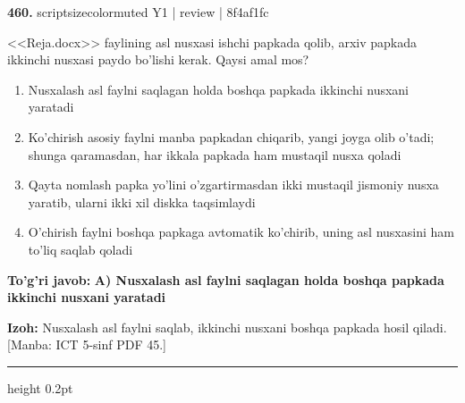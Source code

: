 \documentclass[10pt,a4paper]{article}
\begin{document}
{\bfseries\sffamily\color{ink} 460.} {scriptsizecolor{muted} Y1 | review | 8f4af1fc}
\par
<<Reja.docx>> faylining asl nusxasi ishchi papkada qolib, arxiv papkada ikkinchi nusxasi paydo bo'lishi kerak. Qaysi amal mos?
\begin{enumerate}[label=\Alph*),leftmargin=9mm]
\item Nusxalash asl faylni saqlagan holda boshqa papkada ikkinchi nusxani yaratadi
\item Ko'chirish asosiy faylni manba papkadan chiqarib, yangi joyga olib o'tadi; shunga qaramasdan, har ikkala papkada ham mustaqil nusxa qoladi
\item Qayta nomlash papka yo'lini o'zgartirmasdan ikki mustaqil jismoniy nusxa yaratib, ularni ikki xil diskka taqsimlaydi
\item O'chirish faylni boshqa papkaga avtomatik ko'chirib, uning asl nusxasini ham to'liq saqlab qoladi
\end{enumerate}
\begin{tcolorbox}[enhanced,breakable,colback=teal!4,colframe=teal!60!black,boxrule=0.45pt,arc=1.2mm,left=2.7mm,right=2.7mm,top=1.8mm,bottom=1.8mm,before skip=2mm,after skip=2mm]
{\bfseries\sffamily\color{teal}To'g'ri javob:} \textbf{A) Nusxalash asl faylni saqlagan holda boshqa papkada ikkinchi nusxani yaratadi}
\par\smallskip
{\bfseries Izoh:} Nusxalash asl faylni saqlab, ikkinchi nusxani boshqa papkada hosil qiladi. [Manba: ICT 5-sinf PDF 45.]
\end{tcolorbox}
\vspace{2mm}\hrule height 0.2pt\vspace{3mm}
\end{document}
